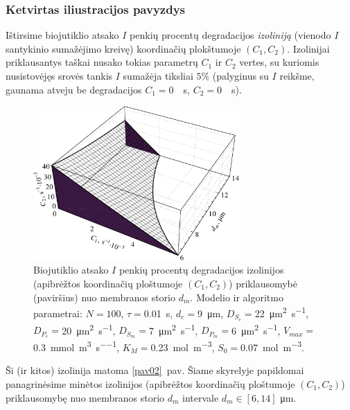 \documentclass[a4paper,12pt]{article}
\begin{document}
\subsubsection{Ketvirtas iliustracijos pavyzdys}

Ištirsime biojutiklio atsako $I$ penkių procentų degradacijos \emph{izoliniją} (vienodo $I$ santykinio sumažėjimo kreivę) koordinačių plokštumoje $\left( C_1, C_2 \right)$.
Izolinijai priklausantys taškai nusako tokias parametrų $C_1$ ir $C_2$ vertes, su kuriomis nusistovėjęs srovės tankis $I$ sumažėja tiksliai $5$\%
(palyginus su $I$ reikšme, gaunama atveju be degradacijos $C_1 ={}$\SI{0}{\per\second}, $C_2 ={}$\SI{0}{\per\second}).

\begin{figure}[ht!]
    \centering
    \includegraphics[clip=true, width=0.7\textwidth]{figures/fig04.pdf}
    \caption{Biojutiklio atsako $I$ penkių procentų degradacijos izolinijos (apibrėžtos koordinačių ploštumoje $\left( C_1, C_2 \right)$) priklausomybė (paviršius)
    nuo membranos storio $d_m$.
    Modelio ir algoritmo parametrai:
    $N = 100$, $\tau ={}$\SI{0.01}{\second},
    $d_e ={}$\SI{9}{\micro\metre}, $D_{S_e} ={}$\SI{22}{\micro\metre\squared\per\second}, $D_{P_e} ={}$\SI{20}{\micro\metre\squared\per\second},
    $D_{S_m} ={}$\SI{7}{\micro\metre\squared\per\second}, $D_{P_m} ={}$\SI{6}{\micro\metre\squared\per\second}, $V_{max} ={}$\SI{0.3}{\milli\mole\per\metre\cubed\per\second},
    $K_M ={}$\SI{0.23}{\mole\per\metre\cubed}, $S_0 ={}$\SI{0.07}{\mole\per\metre\cubed}.}
    \label{pav04}
\end{figure}

Ši (ir kitos) izolinija matoma \ref{pav02}~pav. Šiame skyrelyje papildomai panagrinėsime minėtos izolinijos (apibrėžtos koordinačių ploštumoje $\left( C_1, C_2 \right)$)
priklausomybę nuo membranos storio $d_m$ intervale $d_m\in [6,14]$ \si{\micro\metre}.
\end{document}
